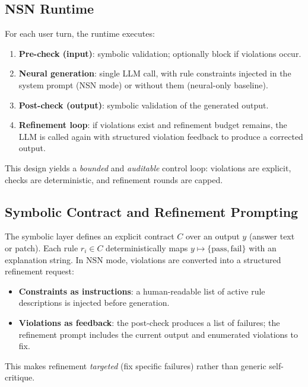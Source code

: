 \documentclass[conference]{IEEEtran}
\begin{document}
\subsection{NSN Runtime}
For each user turn, the runtime executes:
\begin{enumerate}
  \item \textbf{Pre-check (input)}: symbolic validation; optionally block if violations occur.
  \item \textbf{Neural generation}: single LLM call, with rule constraints injected in the system prompt (NSN mode) or without them (neural-only baseline).
  \item \textbf{Post-check (output)}: symbolic validation of the generated output.
  \item \textbf{Refinement loop}: if violations exist and refinement budget remains, the LLM is called again with structured violation feedback to produce a corrected output.
\end{enumerate}
This design yields a \emph{bounded} and \emph{auditable} control loop: violations are explicit, checks are deterministic, and refinement rounds are capped.

\subsection{Symbolic Contract and Refinement Prompting}
The symbolic layer defines an explicit contract \(C\) over an output \(y\) (answer text or patch). Each rule \(r_i \in C\) deterministically maps \(y \mapsto \{\text{pass},\text{fail}\}\) with an explanation string. In NSN mode, violations are converted into a structured refinement request:
\begin{itemize}
  \item \textbf{Constraints as instructions}: a human-readable list of active rule descriptions is injected before generation.
  \item \textbf{Violations as feedback}: the post-check produces a list of failures; the refinement prompt includes the current output and enumerated violations to fix.
\end{itemize}
This makes refinement \emph{targeted} (fix specific failures) rather than generic self-critique.
\end{document}
